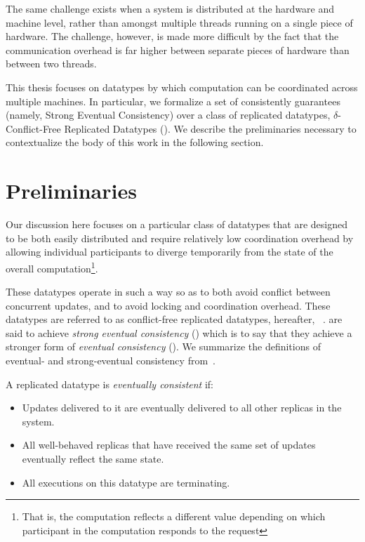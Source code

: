 The same challenge exists when a system is distributed at the hardware and
machine level, rather than amongst multiple threads running on a single piece of
hardware. The challenge, however, is made more difficult by the fact that the
communication overhead is far higher between separate pieces of hardware than
between two threads.

This thesis focuses on datatypes by which computation can be coordinated across
multiple machines. In particular, we formalize a set of consistently guarantees
(namely, Strong Eventual Consistency) over a class of replicated datatypes,
$\delta$-Conflict-Free Replicated Datatypes (\CRDTs). We describe the
preliminaries necessary to contextualize the body of this work in the following
section.

\section{Preliminaries}
Our discussion here focuses on a particular class of datatypes that are designed
to be both easily distributed and require relatively low coordination overhead
by allowing individual participants to diverge temporarily from the state of the
overall computation\footnote{That is, the computation reflects a different
value depending on which participant in the computation responds to the
request}.

These datatypes operate in such a way so as to both avoid conflict between
concurrent updates, and to avoid locking and coordination overhead. These
datatypes are referred to as conflict-free replicated datatypes, hereafter,
\CRDTs~\citep{shapiro11}. \CRDTs are said to achieve \textit{strong eventual
consistency} (\SEC) which is to say that they achieve a stronger form of
\textit{eventual consistency} (\EC). We summarize the definitions of eventual-
and strong-eventual consistency from~\cite{shapiro11}.

\begin{definition}
  \label{def:eventual-consistency}
  A replicated datatype is \textit{eventually consistent} if:
  \begin{itemize}
    \item Updates delivered to it are eventually delivered to all other replicas
      in the system.
    \item All well-behaved replicas that have received the same set of updates
      eventually reflect the same state.
    \item All executions on this datatype are terminating.
  \end{itemize}
\end{definition}

